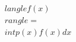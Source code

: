 \documentclass[preview]{standalone}
\begin{document}
\begin{align*}
\quad\\langle f(x) \quad\\rangle = \quad\\int p(x)f(x)dx
\end{align*}
\end{document}

